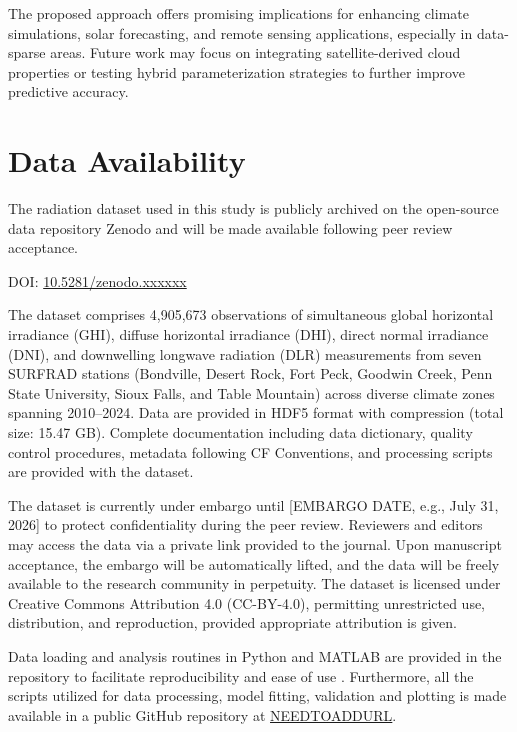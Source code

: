 \documentclass[preprint,12pt]{elsarticle}
\begin{document}
The proposed approach offers promising implications for enhancing climate simulations, solar forecasting, and remote sensing applications, especially in data-sparse areas. Future work may focus on integrating satellite-derived cloud properties or testing hybrid parameterization strategies to further improve predictive accuracy.

\section*{Data Availability}

The radiation dataset used in this study is publicly archived on the open-source data repository Zenodo 
and will be made available following peer review acceptance.

\noindent DOI: \href{https://doi.org/10.5281/zenodo.xxxxxx}{10.5281/zenodo.xxxxxx}

\noindent The dataset comprises 4,905,673 observations of simultaneous global horizontal 
irradiance (GHI), diffuse horizontal irradiance (DHI), direct normal irradiance (DNI), 
and downwelling longwave radiation (DLR) measurements from seven SURFRAD stations 
(Bondville, Desert Rock, Fort Peck, Goodwin Creek, Penn State University, Sioux Falls, 
and Table Mountain) across diverse climate zones spanning 2010--2024. Data are provided 
in HDF5 format with compression (total size: 15.47 GB). Complete documentation including 
data dictionary, quality control procedures, metadata following CF Conventions, and 
processing scripts are provided with the dataset.

The dataset is currently under embargo until [EMBARGO DATE, e.g., July 31, 2026] to protect 
confidentiality during the peer review. Reviewers and editors may access the data via a private 
link provided to the journal. Upon manuscript acceptance, the embargo will be automatically 
lifted, and the data will be freely available to the research community in perpetuity. 
The dataset is licensed under Creative Commons Attribution 4.0 (CC-BY-4.0), permitting unrestricted use, distribution, and reproduction, provided appropriate attribution is given.

Data loading and analysis routines in Python and MATLAB are provided in the repository 
to facilitate reproducibility and ease of use \citep{SURFRAD_data_cleaned}. Furthermore, all the scripts utilized for data processing, model fitting, validation and plotting is made available in a public GitHub repository at \url{NEEDTOADDURL}.
\end{document}
